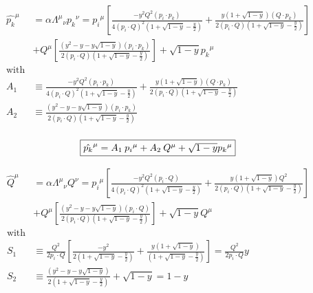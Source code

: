 \begin{equation*}
	\begin{aligned}
	{\hat{{p_k}}}^{\mu}&=\alpha{\Lambda^{\mu}}_{\nu} {p_k}^{\nu}= {p_i}^{\mu}[  \frac{-y^2 Q^2 (p_{i}\cdot {p_k})}{4(p_i\cdot Q)^2(1+\sqrt{1-y}-\frac{y}{2})}+ \frac{y(1+\sqrt{1-y})(Q \cdot {p_k})}{2(p_i\cdot Q)(1+\sqrt{1-y}-\frac{y}{2})}]\\
	&+{Q}^{\mu} [ \frac{(y^2 -y-y\sqrt{1-y}) (p_{i}\cdot {p_k})}{2(p_i\cdot Q)(1+\sqrt{1-y}-\frac{y}{2})}]+\sqrt{1-y} {p_k}^{\mu}\\	
\text{with}\\
	A_1 &\equiv  \frac{-y^2 Q^2 (p_{i}\cdot {p_k})}{4(p_i\cdot Q)^2(1+\sqrt{1-y}-\frac{y}{2})}+ \frac{y(1+\sqrt{1-y})(Q \cdot {p_k})}{2(p_i\cdot Q)(1+\sqrt{1-y}-\frac{y}{2})}\\
		A_2 &\equiv   \frac{(y^2 -y-y\sqrt{1-y}) (p_{i}\cdot {p_k})}{2(p_i\cdot Q)(1+\sqrt{1-y}-\frac{y}{2})}\:\:\:\:\:\:\:\:\:\:\:\:\:\:\:\:\:\:\:\:\:\:\:\:\:\:\:\:\:\:\:\:\:\:\:\:\:\:\:\:\:\:\:\:\:\:\:\:\:\:\:\:\:\:\\\
    \end{aligned}    
\end{equation*}

\begin{equation}
	\begin{aligned}
		\fbox{$  {\hat{{p_k}}}^{\mu}= A_1 \:{p_i}^{\mu}+A_2\:{Q}^{\mu}+\sqrt{1-y} {p_k}^{\mu} $}
    \end{aligned}
\end{equation}

\begin{equation*}
	\begin{aligned}
	{\hat{{Q}}}^{\mu}&=\alpha{\Lambda^{\mu}}_{\nu} {Q}^{\nu}= {p_i}^{\mu}[  \frac{-y^2 Q^2 (p_{i}\cdot {Q})}{4(p_i\cdot Q)^2(1+\sqrt{1-y}-\frac{y}{2})}+ \frac{y(1+\sqrt{1-y})Q^2}{2(p_i\cdot Q)(1+\sqrt{1-y}-\frac{y}{2})}]\\
	&+{Q}^{\mu} [ \frac{(y^2 -y-y\sqrt{1-y}) (p_{i}\cdot {Q})}{2(p_i\cdot Q)(1+\sqrt{1-y}-\frac{y}{2})}]
	+\sqrt{1-y} {Q}^{\mu}\\
\text{with}\\
	S_1 &\equiv  \frac{Q^2}{2p_i \cdot Q}[\frac{-y^2}{2(1+\sqrt{1-y}-\frac{y}{2})}+ \frac{y(1+\sqrt{1-y})}{(1+\sqrt{1-y}-\frac{y}{2})}]=\frac{Q^2}{2p_i \cdot Q}y\\
		S_2 &\equiv   \frac{(y^2 -y-y\sqrt{1-y})}{2(1+\sqrt{1-y}-\frac{y}{2})}+\sqrt{1-y}=1-y\:\:\:\:\:\:\:\:\:\:\:\:\:\:\:\:\:\:\:\:\:\:\:\:\:\:\:\:\:\:\:\:\:\:\:\:\:\:\:\:\:\:\:\:\:\:\:\:\:\:\:\:\:\:\\\	
    \end{aligned}    
\end{equation*}

